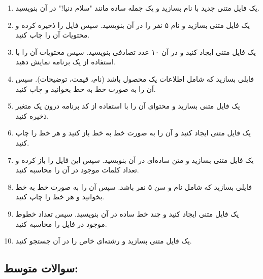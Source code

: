 \documentclass[a4paper,12pt]{article}
\begin{document}
	\begin{enumerate}
		\item یک فایل متنی جدید با نام  بسازید و یک جمله ساده مانند "سلام دنیا!" در آن بنویسید.
		\item یک فایل متنی بسازید و نام ۵ نفر را در آن بنویسید. سپس فایل را ذخیره کرده و محتویات آن را چاپ کنید.
		\item یک فایل متنی ایجاد کنید و در آن ۱۰ عدد تصادفی بنویسید. سپس محتویات آن را با استفاده از یک برنامه نمایش دهید.
		\item فایلی بسازید که شامل اطلاعات یک محصول باشد (نام، قیمت، توضیحات). سپس آن را به صورت خط به خط بخوانید و چاپ کنید.
		\item یک فایل متنی بسازید و محتوای آن را با استفاده از کد برنامه درون یک متغیر ذخیره کنید.
		\item یک فایل متنی ایجاد کنید و آن را به صورت خط به خط باز کنید و هر خط را چاپ کنید.
		\item یک فایل متنی بسازید و متن ساده‌ای در آن بنویسید. سپس این فایل را باز کرده و تعداد کلمات موجود در آن را محاسبه کنید.
		\item فایلی بسازید که شامل نام و سن ۵ نفر باشد. سپس آن را به صورت خط به خط بخوانید و هر خط را چاپ کنید.
		\item یک فایل متنی ایجاد کنید و چند خط ساده در آن بنویسید. سپس تعداد خطوط موجود در فایل را محاسبه کنید.
		\item یک فایل متنی بسازید و رشته‌ای خاص را در آن جستجو کنید.
	\end{enumerate}
	
	\subsection*{سوالات متوسط:}
	
\end{document}
